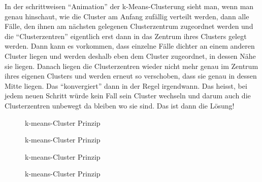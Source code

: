\documentclass[
  10pt,
  letterpaper,
  a4paper, twoside]{scrreprt}
\begin{document}
In der schrittweisen \enquote{Animation} der k-Means-Clusterung sieht
man, wenn man genau hinschaut, wie die Cluster am Anfang zufällig
verteilt werden, dann alle Fälle, den ihnen am nächsten gelegenen
Clusterzentrum zugeordnet werden und die \enquote{Clusterzentren}
eigentlich erst dann in das Zentrum ihres Clusters gelegt werden. Dann
kann es vorkommen, dass einzelne Fälle dichter an einem anderen Cluster
liegen und werden deshalb eben dem Cluster zugeordnet, in dessen Nähe
sie liegen. Danach liegen die Clusterzentren wieder nicht mehr genau im
Zentrum ihres eigenen Clusters und werden erneut so verschoben, dass sie
genau in dessen Mitte liegen. Das \enquote{konvergiert} dann in der
Regel irgendwann. Das heisst, bei jedem neuen Schritt würde kein Fall
sein Cluster wechseln und darum auch die Clusterzentren unbewegt da
bleiben wo sie sind. Das ist dann die Lösung!

\begin{figure}


\caption{\label{fig-kmeans-Animation-1}k-means-Cluster Prinzip}

\end{figure}%

\begin{figure}


\caption{\label{fig-kmeans-Animation-2}k-means-Cluster Prinzip}

\end{figure}%

\begin{figure}


\caption{\label{fig-kmeans-Animation-3}k-means-Cluster Prinzip}

\end{figure}%

\begin{figure}


\caption{\label{fig-kmeans-Animation-4}k-means-Cluster Prinzip}

\end{figure}%
\end{document}
